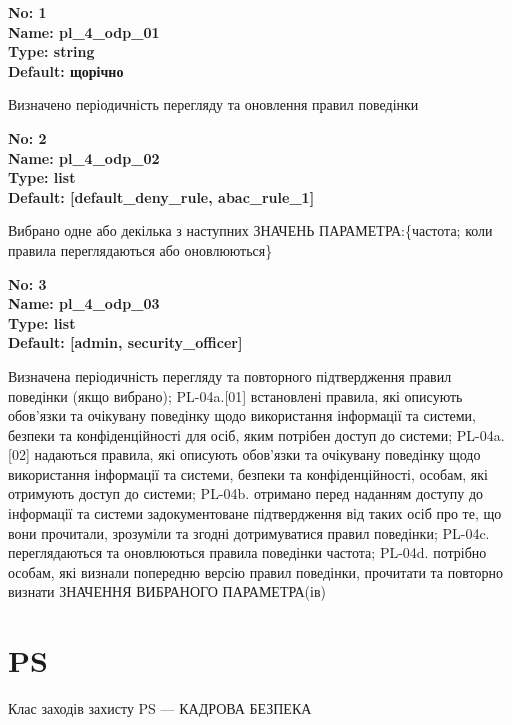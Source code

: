 \documentclass{article}
\begin{document}
\vspace{10pt}
{\footnotesize\bfseries
No: 1\\
Name: pl\_\allowbreak{}4\_\allowbreak{}odp\_\allowbreak{}01\\
Type: string\\
Default: \textquotedbl{}щорічно\textquotedbl{}
}

{\footnotesize Визначено періодичність перегляду та оновлення правил поведінки}


{\footnotesize\bfseries
No: 2\\
Name: pl\_\allowbreak{}4\_\allowbreak{}odp\_\allowbreak{}02\\
Type: list\\
Default: [\textquotedbl{}default\_\allowbreak{}deny\_\allowbreak{}rule\textquotedbl{}, \textquotedbl{}abac\_\allowbreak{}rule\_\allowbreak{}1\textquotedbl{}]
}

{\footnotesize Вибрано одне або декілька з наступних ЗНАЧЕНЬ ПАРАМЕТРА:\{частота; коли правила переглядаються або оновлюються\}}


{\footnotesize\bfseries
No: 3\\
Name: pl\_\allowbreak{}4\_\allowbreak{}odp\_\allowbreak{}03\\
Type: list\\
Default: [\textquotedbl{}admin\textquotedbl{}, \textquotedbl{}security\_\allowbreak{}officer\textquotedbl{}]
}

{\footnotesize Визначена періодичність перегляду та повторного підтвердження правил поведінки (якщо вибрано); PL-04a.[01] встановлені правила, які описують обов'язки та очікувану поведінку щодо використання інформації та системи, безпеки та конфіденційності для осіб, яким потрібен доступ до системи; PL-04a.[02] надаються правила, які описують обов'язки та очікувану поведінку щодо використання інформації та системи, безпеки та конфіденційності, особам, які отримують доступ до системи; PL-04b. отримано перед наданням доступу до інформації та системи задокументоване підтвердження від таких осіб про те, що вони прочитали, зрозуміли та згодні дотримуватися правил поведінки; PL-04c. переглядаються та оновлюються правила поведінки частота; PL-04d. потрібно особам, які визнали попередню версію правил поведінки, прочитати та повторно визнати ЗНАЧЕННЯ ВИБРАНОГО ПАРАМЕТРА(ів)}




\section{PS}
Клас заходів захисту PS --- КАДРОВА БЕЗПЕКА
\end{document}
